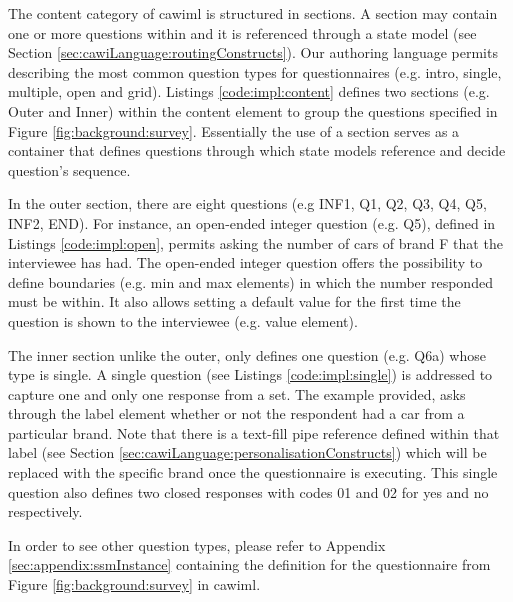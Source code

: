 	The content category of \gls{cawiml} is structured in sections. A section may contain one or more questions within and it is referenced through a state model (see Section \ref{sec:cawiLanguage:routingConstructs}). Our authoring language permits describing the most common question types for questionnaires (e.g. intro, single, multiple, open and grid). Listings \ref{code:impl:content} defines two sections (e.g. Outer and Inner) within the content element to group the questions specified in Figure \ref{fig:background:survey}. Essentially the use of a section serves as a container that defines questions through which state models reference and decide question's sequence. 
	

	In the outer section, there are eight questions (e.g INF1, Q1, Q2, Q3, Q4, Q5, INF2, END). For instance, an open-ended integer question (e.g. Q5), defined in Listings \ref{code:impl:open}, permits asking the number of cars of brand F that the interviewee has had. The open-ended integer question offers the possibility to define boundaries (e.g. min and max elements) in which the number responded must be within. It also allows setting a default value for the first time the question is shown to the interviewee (e.g. value element).

	

	The inner section unlike the outer, only defines one question (e.g. Q6a) whose type is single. A single question (see Listings \ref{code:impl:single}) is addressed to capture one and only one response from a set. The example provided, asks through the label element whether or not the respondent had a car from a particular brand. Note that there is a text-fill pipe reference defined within that label (see Section \ref{sec:cawiLanguage:personalisationConstructs}) which will be replaced with the specific brand once the questionnaire is executing. This single question also defines two closed responses with codes 01 and 02 for yes and no respectively.

	

	In order to see other question types, please refer to Appendix \ref{sec:appendix:ssmInstance} containing the definition for the questionnaire from Figure \ref{fig:background:survey} in \gls{cawiml}.